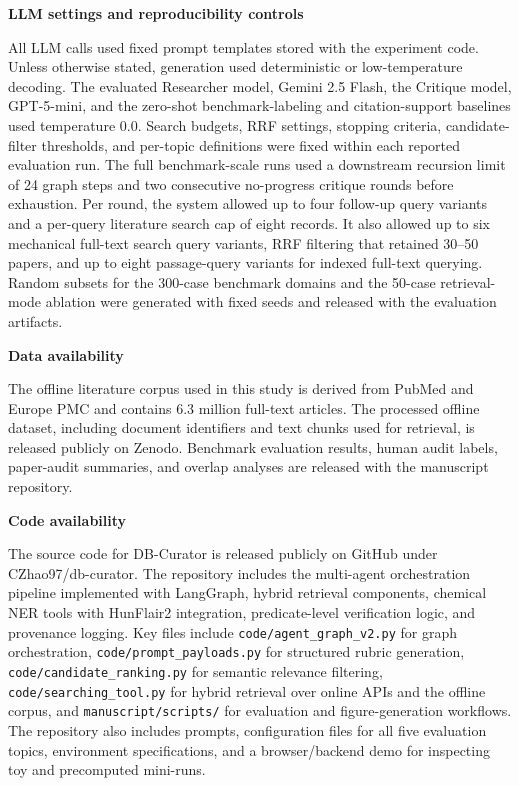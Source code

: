 \documentclass[
]{article}
\begin{document}
\textbf{LLM settings and reproducibility controls}

All LLM calls used fixed prompt templates stored with the experiment
code. Unless otherwise stated, generation used deterministic or
low-temperature decoding. The evaluated Researcher model, Gemini 2.5
Flash, the Critique model, GPT-5-mini, and the zero-shot benchmark-labeling
and citation-support baselines used temperature 0.0. Search budgets, RRF
settings, stopping criteria, candidate-filter thresholds, and per-topic
definitions were fixed within each reported evaluation run. The full
benchmark-scale runs used a downstream recursion limit of 24 graph
steps and two consecutive no-progress critique rounds before exhaustion.
Per round, the system allowed up to four follow-up query variants and a
per-query literature search cap of eight records. It also allowed up to
six mechanical full-text search query variants, RRF filtering that
retained 30--50 papers, and up to eight passage-query variants for
indexed full-text querying. Random subsets
for the 300-case benchmark domains and the 50-case retrieval-mode
ablation were generated with fixed seeds and released with the
evaluation artifacts.

\textbf{Data availability}

The offline literature corpus used in this study is derived from
PubMed and Europe PMC and contains 6.3 million full-text articles. The
processed offline dataset, including document identifiers and text
chunks used for retrieval, is released publicly on Zenodo. Benchmark
evaluation results, human audit labels, paper-audit summaries, and
overlap analyses are released with the manuscript repository.

\textbf{Code availability}

The source code for DB-Curator is released publicly on GitHub under
CZhao97/db-curator. The repository includes the multi-agent orchestration
pipeline implemented with LangGraph, hybrid retrieval components,
chemical NER tools with HunFlair2 integration, predicate-level
verification logic, and provenance logging. Key files include
\texttt{code/agent\_graph\_v2.py} for graph orchestration,
\texttt{code/prompt\_payloads.py} for structured rubric generation,
\texttt{code/candidate\_ranking.py} for semantic relevance filtering,
\texttt{code/searching\_tool.py} for hybrid retrieval over online APIs
and the offline corpus, and \texttt{manuscript/scripts/} for evaluation
and figure-generation workflows. The repository also includes prompts,
configuration files for all five evaluation topics, environment
specifications, and a browser/backend demo for inspecting toy and
precomputed mini-runs.
\end{document}
